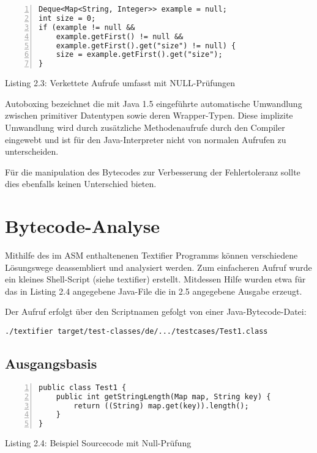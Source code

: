 \vspace{0.3cm}

\begin{lstlisting}[basicstyle=\ttfamily,numbers=left,numberstyle=\footnotesize\ttfamily,backgroundcolor=\color{source}]
Deque<Map<String, Integer>> example = null;
int size = 0;
if (example != null &&
	example.getFirst() != null &&
	example.getFirst().get("size") != null) {
	size = example.getFirst().get("size");
}
\end{lstlisting}
\centerline{Listing 2.3: Verkettete Aufrufe umfasst mit NULL-Prüfungen}

\vspace{0.3cm}

Autoboxing bezeichnet die mit Java 1.5 eingeführte automatische Umwandlung zwischen
primitiver Datentypen sowie deren Wrapper-Typen. Diese implizite Umwandlung wird
durch zusätzliche Methodenaufrufe durch den Compiler eingewebt und ist für den
Java-Interpreter nicht von normalen Aufrufen zu unterscheiden.

Für die manipulation des Bytecodes zur Verbesserung der Fehlertoleranz sollte
dies ebenfalls keinen Unterschied bieten.


\section{Bytecode-Analyse}

Mithilfe des im ASM enthaltenenen Textifier Programms können verschiedene Lösungswege
deassembliert und analysiert werden. Zum einfacheren Aufruf wurde ein kleines Shell-Script
(siehe textifier) erstellt. Mitdessen Hilfe wurden etwa für das in Listing 2.4 angegebene
Java-File die in 2.5 angegebene Ausgabe erzeugt.

Der Aufruf erfolgt über den Scriptnamen gefolgt von einer Java-Bytecode-Datei:

\texttt{./textifier target/test-classes/de/.../testcases/Test1.class}


\subsection{Ausgangsbasis}

\begin{lstlisting}[basicstyle=\ttfamily,numbers=left,numberstyle=\footnotesize\ttfamily,backgroundcolor=\color{source}]
public class Test1 {
	public int getStringLength(Map map, String key) {
		return ((String) map.get(key)).length();
	}
}
\end{lstlisting}
\centerline{Listing 2.4: Beispiel Sourcecode mit Null-Prüfung}

